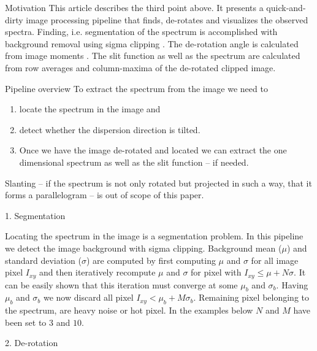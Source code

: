 \documentclass[final,t]{beamer}
\begin{document}
\begin{frame}
\begin{columns}[t]
\begin{column}{.32\linewidth}
\begin{block}{Motivation}
			This article describes the third point above.
			It presents a quick-and-dirty image processing pipeline that finds, de-rotates and visualizes the observed spectra.
			Finding, i.e. segmentation of the spectrum is accomplished with background removal using sigma clipping \cite{SigmaClipping}. The de-rotation angle is calculated from image moments \cite{ImageMoments}.
			The slit function as well as the spectrum are calculated from row averages and column-maxima of the de-rotated clipped image.
				\end{block}     
				
				\begin{block}{Pipeline overview}
					To extract the spectrum from the image we need to 
					\begin{enumerate}
						\item locate the spectrum in the image and
						\item detect whether the dispersion direction is tilted.
						\item Once we have the image de-rotated and located we can extract the one dimensional spectrum as well as the slit function -- if needed.
					\end{enumerate}
					
					Slanting -- if the spectrum is not only rotated but projected in such a way, that it forms a parallelogram -- is out of scope of this paper.
					
				\end{block}
				
				\begin{block}{1. Segmentation}
					\label{segmentation}
			
					Locating the spectrum in the image is a segmentation problem.
					In this pipeline we detect the image background with sigma clipping.
					Background mean ($\mu$) and standard deviation ($\sigma$) are computed by first computing $\mu$ and $\sigma$ for all image pixel $I_{xy}$ and then iteratively recompute $\mu$ and $\sigma$ for pixel with $I_{xy} \le \mu + N \sigma$.
					It can be easily shown that this iteration must converge at some $\mu_b$ and $\sigma_b$.
					Having $\mu_b$ and $\sigma_b$ we now discard all pixel $I_{xy} < \mu_b + M \sigma_b$.
					Remaining pixel belonging to the spectrum, are heavy noise or hot pixel.
					In the examples below $N$ and $M$ have been set to $3$ and $10$.
				\end{block}
				
				\begin{block}{2. De-rotation}
					\label{derotation}
			

\end{block}
\end{column}
\end{columns}
\end{frame}
\end{document}
